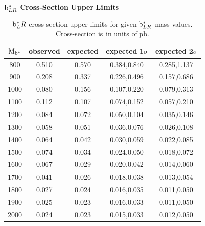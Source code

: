 \begin{table}[htcb]
\begin{center}
\bf{$\mathrm{b}^{*}_{LR}$ Cross-Section Upper Limits}\\
\begin{tabular}{c||c|c|c|c}
\hline\hline
\bf{$\mathrm{M_{\mathrm{b}^{*}}}$} & \bf{observed}  & \bf{expected} & \bf{expected 1$\sigma$}  & \bf{expected 2$\sigma$} \\
\hline
\hline
800 & 0.510 & 0.570 & 0.384,0.840 & 0.285,1.137\\ 
900 & 0.208 & 0.337 & 0.226,0.496 & 0.157,0.686\\ 
1000 & 0.080 & 0.156 & 0.107,0.220 & 0.079,0.313\\ 
1100 & 0.112 & 0.107 & 0.074,0.152 & 0.057,0.210\\ 
1200 & 0.084 & 0.072 & 0.050,0.104 & 0.035,0.146\\ 
1300 & 0.058 & 0.051 & 0.036,0.076 & 0.026,0.108\\ 
1400 & 0.064 & 0.042 & 0.030,0.059 & 0.022,0.085\\ 
1500 & 0.074 & 0.034 & 0.024,0.050 & 0.018,0.072\\
1600 & 0.067 & 0.029 & 0.020,0.042 & 0.014,0.060\\ 
1700 & 0.041 & 0.026 & 0.018,0.038 & 0.013,0.054\\ 
1800 & 0.027 & 0.024 & 0.016,0.035 & 0.011,0.050\\ 
1900 & 0.025 & 0.023 & 0.016,0.033 & 0.011,0.050\\ 
2000 & 0.024 & 0.023 & 0.015,0.033 & 0.012,0.050\\ 
\hline
\end{tabular}
\end{center}
\caption{$\mathrm{b}^{*}_LR$ cross-section upper limits for given $\mathrm{b}^{*}_{LR}$ mass values.  Cross-section is in units of pb.}
\label{table:bsupperxsecLR}
\end{table}


